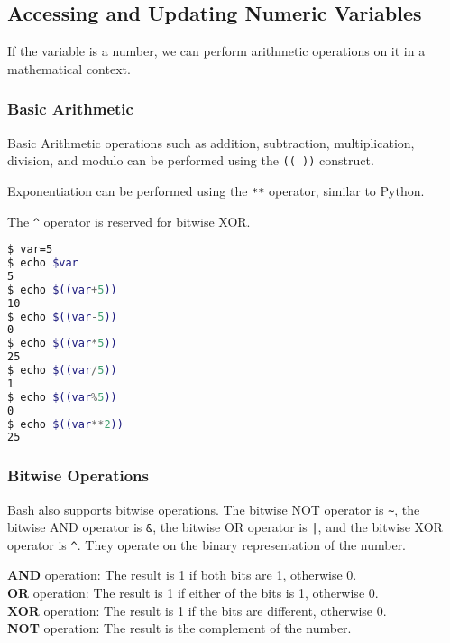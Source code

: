 \subsection{Accessing and Updating Numeric Variables}

If the variable is a number, we can perform arithmetic operations on it in a mathematical context.

\subsubsection{Basic Arithmetic}

Basic Arithmetic operations such as addition, subtraction, multiplication, division, and modulo can be performed using the \lstinline{(( ))} construct.

Exponentiation can be performed using the \lstinline{**} operator, similar to Python.

The \lstinline{^} operator is reserved for bitwise XOR.

\begin{lstlisting}[language=bash]
$ var=5
$ echo $var
5
$ echo $((var+5))
10
$ echo $((var-5))
0
$ echo $((var*5))
25
$ echo $((var/5))
1
$ echo $((var%5))
0
$ echo $((var**2))
25
\end{lstlisting}

\subsubsection{Bitwise Operations}

Bash also supports bitwise operations. The bitwise NOT operator is \lstinline{~}, the bitwise AND operator is \lstinline{&}, the bitwise OR operator is \lstinline{|}, and the bitwise XOR operator is \lstinline{^}. They operate on the binary representation of the number.

\textbf{AND} operation: The result is 1 if both bits are 1, otherwise 0. \\
\textbf{OR} operation: The result is 1 if either of the bits is 1, otherwise 0. \\
\textbf{XOR} operation: The result is 1 if the bits are different, otherwise 0. \\
\textbf{NOT} operation: The result is the complement of the number.

